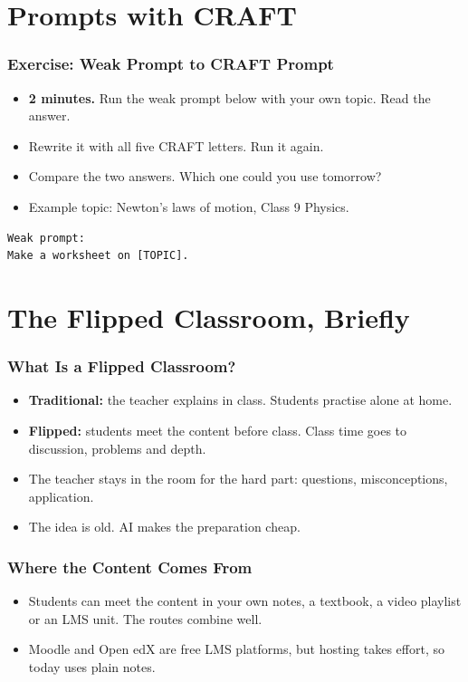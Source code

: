 \section[Prompts]{Prompts with CRAFT}


\begin{frame}[fragile]\frametitle{Exercise: Weak Prompt to CRAFT Prompt}
\begin{itemize}
\item \textbf{2 minutes.} Run the weak prompt below with your own topic. Read the answer.
\item Rewrite it with all five CRAFT letters. Run it again.
\item Compare the two answers. Which one could you use tomorrow?
\item Example topic: Newton's laws of motion, Class 9 Physics.
\end{itemize}
\begin{lstlisting}[language={}]
Weak prompt:
Make a worksheet on [TOPIC].
\end{lstlisting}
\end{frame}

\section[Flipped]{The Flipped Classroom, Briefly}

\begin{frame}[fragile]\frametitle{What Is a Flipped Classroom?}
\begin{itemize}
\item \textbf{Traditional:} the teacher explains in class. Students practise alone at home.
\item \textbf{Flipped:} students meet the content before class. Class time goes to discussion, problems and depth.
\item The teacher stays in the room for the hard part: questions, misconceptions, application.
\item The idea is old. AI makes the preparation cheap.
\end{itemize}
\end{frame}

\begin{frame}[fragile]\frametitle{Where the Content Comes From}
\begin{itemize}
\item Students can meet the content in your own notes, a textbook, a video playlist or an LMS unit. The routes combine well.
\item Moodle and Open edX are free LMS platforms, but hosting takes effort, so today uses plain notes.
\end{itemize}
\end{frame}

